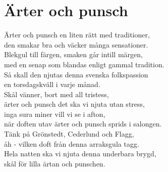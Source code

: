 \section{Ärter och punsch}
Ärter och punsch en liten rätt med traditioner,\\
den smakar bra och väcker många sensationer.\\
Blekgul till färgen, smaken går intill märgen,\\
med en senap som blandas enligt gammal tradition.\\
Så skall den njutas denna svenska folkspassion\\
en torsdagskväll i varje månad.\\

Skål vänner, bort med all tristess,\\
ärter och punsch det ska vi njuta utan stress,\\
inga sura miner vill vi se i afton,\\
när doften utav ärter och punsch sprids i salongen.\\
Tänk på Grönstedt, Cederlund och Flagg,\\
åh - vilken doft från denna arraksgula tagg.\\
Hela natten ska vi njuta denna underbara brygd,\\
skål för lilla ärtan och punschen.\\